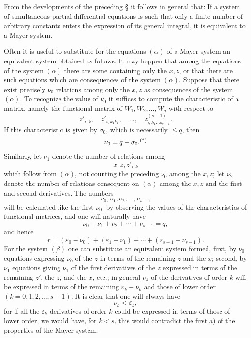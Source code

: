 \documentclass[11pt]{book}
\begin{document}
From the developments of the preceding \S{} it follows in general that: If a system of simultaneous partial differential equations is such that only a finite number of arbitrary constants enters the expression of its general integral, it is equivalent to a Mayer system.

Often it is useful to substitute for the equations $(\alpha)$ of a Mayer system an equivalent system obtained as follows. It may happen that among the equations of the system $(\alpha)$ there are some containing only the $x,z$, or that there are such equations which are consequences of the system $(\alpha)$. Suppose that there exist precisely $\nu_0$ relations among only the $x,z$ as consequences of the system $(\alpha)$. To recognize the value of $\nu_0$ it suffices to compute the characteristic of a matrix, namely the functional matrix of $W_1,W_2,\ldots,W_q$ with respect to
\[
 z'_{i;k},
 \quad z'_{i;k_1k_2},
 \quad \ldots,
 \quad z^{(s-1)}_{i;k_1\ldots k_{s-1}}.
\]
If this characteristic is given by $\sigma_0$, which is necessarily $\le q$, then
\[
 \nu_0=q-\sigma_0.\begingroup\renewcommand\thefootnote{(*)}\footnotemark\endgroup
\]
\begingroup\renewcommand\thefootnote{(*)}\endgroup{}
Similarly, let $\nu_1$ denote the number of relations among
\[
 x,z,z'_{i;k}
\]
which follow from $(\alpha)$, not counting the preceding $\nu_0$ among the $x,z$; let $\nu_2$ denote the number of relations consequent on $(\alpha)$ among the $x,z$ and the first and second derivatives. The numbers
\[
 \nu_0,\nu_1,\nu_2,\ldots,\nu_{s-1}
\]
will be calculated like the first $\nu_0$, by observing the values of the characteristics of functional matrices, and one will naturally have
\[
 \nu_0+\nu_1+\nu_2+\cdots+\nu_{s-1}=q,
\]
and hence
\[
 r=(\varepsilon_0-\nu_0)+(\varepsilon_1-\nu_1)+\cdots+(\varepsilon_{s-1}-\nu_{s-1}).
\]
For the system $(\beta)$ one can substitute an equivalent system formed, first, by $\nu_0$ equations expressing $\nu_0$ of the $z$ in terms of the remaining $z$ and the $x$; second, by $\nu_1$ equations giving $\nu_1$ of the first derivatives of the $z$ expressed in terms of the remaining $z'$, the $z$, and the $x$, etc.; in general $\nu_k$ of the derivatives of order $k$ will be expressed in terms of the remaining $\varepsilon_k-\nu_k$ and those of lower order $(k=0,1,2,\ldots,s-1)$. It is clear that one will always have
\[
 \nu_k<\varepsilon_k,
\]
for if all the $\varepsilon_k$ derivatives of order $k$ could be expressed in terms of those of lower order, we would have, for $k<s$, this would contradict the first a) of the properties of the Mayer system.
\end{document}
